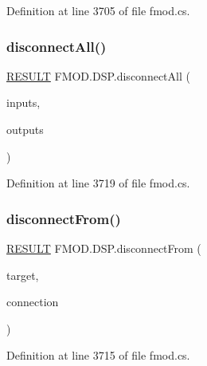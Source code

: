 Definition at line 3705 of file fmod.\+cs.

\mbox{\label{class_f_m_o_d_1_1_d_s_p_a8b07d66e98e0c959763b746df5422fbb}} 
\subsubsection{\texorpdfstring{disconnect\+All()}{disconnectAll()}}
{\footnotesize\ttfamily \hyperlink{namespace_f_m_o_d_a305d1176ef3f8c8815861a60407ac33d}{R\+E\+S\+U\+LT} F\+M\+O\+D.\+D\+S\+P.\+disconnect\+All (\begin{DoxyParamCaption}\item[{bool}]{inputs,  }\item[{bool}]{outputs }\end{DoxyParamCaption})}



Definition at line 3719 of file fmod.\+cs.

\mbox{\label{class_f_m_o_d_1_1_d_s_p_a7de3055ef8036b3c45fe708489fa9091}} 
\subsubsection{\texorpdfstring{disconnect\+From()}{disconnectFrom()}}
{\footnotesize\ttfamily \hyperlink{namespace_f_m_o_d_a305d1176ef3f8c8815861a60407ac33d}{R\+E\+S\+U\+LT} F\+M\+O\+D.\+D\+S\+P.\+disconnect\+From (\begin{DoxyParamCaption}\item[{\hyperlink{class_f_m_o_d_1_1_d_s_p}{D\+SP}}]{target,  }\item[{\hyperlink{class_f_m_o_d_1_1_d_s_p_connection}{D\+S\+P\+Connection}}]{connection }\end{DoxyParamCaption})}



Definition at line 3715 of file fmod.\+cs.

\mbox{\label{class_f_m_o_d_1_1_d_s_p_adb966969e48acdde47d35567d4100545}} 
